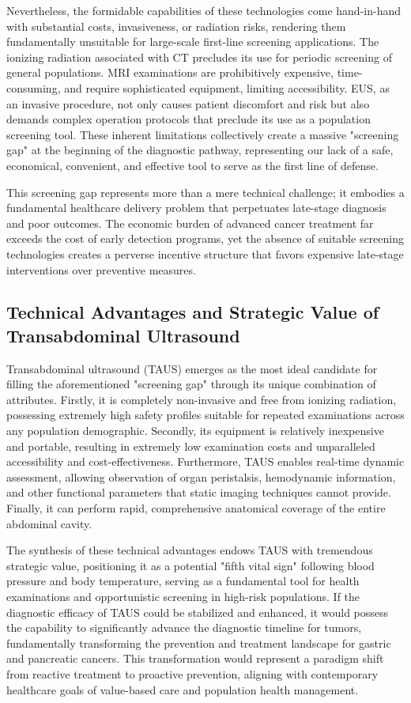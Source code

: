 Nevertheless, the formidable capabilities of these technologies come hand-in-hand with substantial costs, invasiveness, or radiation risks, rendering them fundamentally unsuitable for large-scale first-line screening applications. The ionizing radiation associated with CT precludes its use for periodic screening of general populations. MRI examinations are prohibitively expensive, time-consuming, and require sophisticated equipment, limiting accessibility. EUS, as an invasive procedure, not only causes patient discomfort and risk but also demands complex operation protocols that preclude its use as a population screening tool. These inherent limitations collectively create a massive "screening gap" at the beginning of the diagnostic pathway, representing our lack of a safe, economical, convenient, and effective tool to serve as the first line of defense.

This screening gap represents more than a mere technical challenge; it embodies a fundamental healthcare delivery problem that perpetuates late-stage diagnosis and poor outcomes. The economic burden of advanced cancer treatment far exceeds the cost of early detection programs, yet the absence of suitable screening technologies creates a perverse incentive structure that favors expensive late-stage interventions over preventive measures.

\subsection{Technical Advantages and Strategic Value of Transabdominal Ultrasound}

Transabdominal ultrasound (TAUS) emerges as the most ideal candidate for filling the aforementioned "screening gap" through its unique combination of attributes. Firstly, it is completely non-invasive and free from ionizing radiation, possessing extremely high safety profiles suitable for repeated examinations across any population demographic. Secondly, its equipment is relatively inexpensive and portable, resulting in extremely low examination costs and unparalleled accessibility and cost-effectiveness. Furthermore, TAUS enables real-time dynamic assessment, allowing observation of organ peristalsis, hemodynamic information, and other functional parameters that static imaging techniques cannot provide. Finally, it can perform rapid, comprehensive anatomical coverage of the entire abdominal cavity.

The synthesis of these technical advantages endows TAUS with tremendous strategic value, positioning it as a potential "fifth vital sign" following blood pressure and body temperature, serving as a fundamental tool for health examinations and opportunistic screening in high-risk populations. If the diagnostic efficacy of TAUS could be stabilized and enhanced, it would possess the capability to significantly advance the diagnostic timeline for tumors, fundamentally transforming the prevention and treatment landscape for gastric and pancreatic cancers. This transformation would represent a paradigm shift from reactive treatment to proactive prevention, aligning with contemporary healthcare goals of value-based care and population health management.

